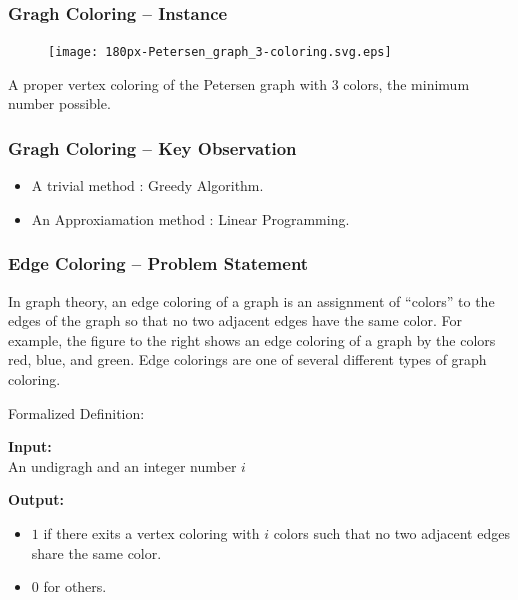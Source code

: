 \documentclass[slidestop,compress,mathserif]{beamer}
\begin{document}
\frame
{
\frametitle{Gragh Coloring -- Instance}
\begin{figure}
 \texttt{[image: 180px-Petersen\_graph\_3-coloring.svg.eps]}
\end{figure}
A proper vertex coloring of the Petersen graph with $3$ colors, the minimum number possible.
}
\frame
{


\frametitle{Gragh Coloring -- Key Observation}
\begin{itemize}
 \item A trivial method : Greedy Algorithm.
 \item An Approxiamation method : Linear Programming.
\end{itemize}

}
\frame
{
\frametitle{Edge Coloring -- Problem Statement}
In graph theory, an edge coloring of a graph is an assignment of “colors” to the edges of the graph so that no two adjacent edges have the same color. For example, the figure to the right shows an edge coloring of a graph by the colors red, blue, and green. Edge colorings are one of several different types of graph coloring.
\begin{block}{Formalized Definition:}

 {\bf Input: }\\
An undigragh and an integer number $i$

 {\bf Output: }\\
\begin{itemize}
  \item $1$ if there exits a vertex coloring with $i$ colors such that no two adjacent edges share the same color.
  \item $0$ for others.
\end{itemize}


\end{block}
}
\end{document}
